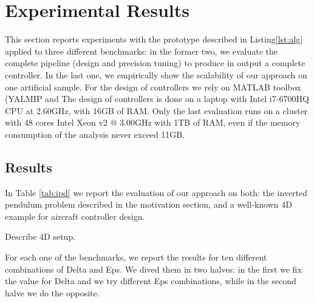 \section{Experimental Results}

This section reports experiments with the prototype described in Listing\ref{lst:alg} applied to three different benchmarks: in the former two, we evaluate the complete pipeline (design and precision tuning) to produce in output a complete controller. In the last one, we empirically show the scalability of our approach on one artificial sample.
For the design of controllers we rely on MATLAB toolbox (YALMIP and 
The design of controllers is done on a laptop with Intel i7-6700HQ CPU at 2.60GHz, with 16GB of RAM. 
Only the last evaluation runs on a cluster with 48 cores Intel Xeon v2 @ 3.00GHz with 1TB of RAM, even if the memory consumption of the analysis never exceed 11GB.

\subsection{Results}

In Table \ref{tab:ipd} we report the evaluation of our approach on both: the inverted pendulum problem described in the motivation section, and a well-known 4D example for aircraft controller design.

Describe 4D setup.

For each one of the benchmarks, we report the results for ten different combinations of Delta and Eps. We dived them in two halves: in the  first we fix the value for Delta and we try different Eps combinations, while in the second halve we do the opposite. 

